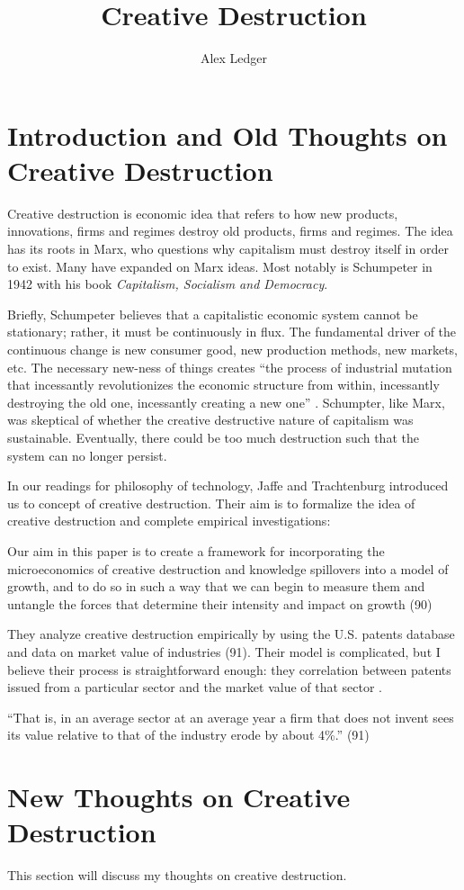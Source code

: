 \documentclass[11pt]{article}
\title{Creative Destruction}
\author{Alex Ledger}
\begin{document}
\maketitle

\section{Introduction and Old Thoughts on Creative Destruction}
Creative destruction is economic idea that refers to how new products, innovations, firms and regimes destroy old products, firms and regimes.
The idea has its roots in Marx, who questions why capitalism must destroy itself in order to exist.
Many have expanded on Marx ideas.
Most notably is Schumpeter in 1942 with his book \textit{Capitalism, Socialism and Democracy}.

Briefly, Schumpeter believes that a capitalistic economic system cannot be stationary; rather, it must be continuously in flux. 
The fundamental driver of the continuous change is new consumer good, new production methods, new markets, etc. 
The necessary new-ness of things creates ``the process of industrial mutation that incessantly revolutionizes the economic structure from within, incessantly destroying the old one, incessantly creating a new one'' \cite{wikipedia quote on schumpeter}.
Schumpter, like Marx, was skeptical of whether the creative destructive nature of capitalism was sustainable. 
Eventually, there could be too much destruction such that the system can no longer persist.

In our readings for philosophy of technology, Jaffe and Trachtenburg introduced us to concept of creative destruction.
Their aim is to formalize the idea of creative destruction and complete empirical investigations:
\begin{displayquote}
    Our aim in this paper is to create a framework for incorporating the microeconomics of creative destruction and knowledge spillovers into a model of growth, and to do so in such a way that we can begin to measure them and untangle the forces that determine their intensity and impact on growth (90)
\end{displayquote}

They analyze creative destruction empirically by using the U.S. patents database and data on market value of industries (91).
Their model is complicated, but I believe their process is straightforward enough: they correlation between patents issued from a particular sector and the market value of that sector . 
\begin{displayquote}
    “That is, in an average sector at an average year a firm that does not invent sees its value relative to that of the industry erode by about 4\%.” (91)
\end{displayquote}


\newpage
\section{New Thoughts on Creative Destruction}
This section will discuss my thoughts on creative destruction.
\end{document}
